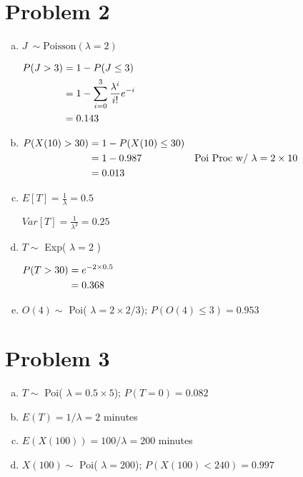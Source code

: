\documentclass[11pt]{article}
\newenvironment{equ}{$\hfill\begin{aligned}[t]}{\end{aligned}\hfill \null$}
\begin{document}
\section*{Problem 2}
\begin{enumerate}[(a)]
	\item $J\ \sim \text{Poisson} ( \lambda = 2 )$

		\begin{equ}
			P( J > 3 ) &= 1 -P( J \leq 3 ) \\
			&= 1-\sum \limits _{i=0} ^{3} \dfrac{\lambda^i}{i!}e^{-i} \\
			&= 0.143
		\end{equ}

	\item
		\begin{equ}
			P( X(10) > 30 ) &= 1 - P( X(10) \leq 30 ) \\
			&= 1 - 0.987 & \text{Poi Proc w/ } \lambda=2 \times 10 \\
			&= 0.013
		\end{equ}

	\item $E[T] = \frac{1}{\lambda} = 0.5$

		$Var[T] = \frac{1}{\lambda ^2} = 0.25$

	\item $T \sim$ Exp( $\lambda = 2$ )

		\begin{equ} 
			P(T > 30) &= e^{-2 \times 0.5} \\
			&= 0.368
		\end{equ}

	\item $O(4) \sim$ Poi( $\lambda = 2 \times 2/3$); $P(O(4) \leq 3) = 0.953$
\end{enumerate}	

\section*{Problem 3}
\begin{enumerate}[(a)]
	\item $T \sim $ Poi( $\lambda = 0.5 \times 5$); $P( T = 0) = 0.082$
	\item $E(T) = 1/\lambda = 2$ minutes
	\item $E(X(100)) = 100 / \lambda = 200$ minutes
	\item $X(100) \sim $ Poi( $\lambda = 200$); $P( X(100) < 240 ) = 0.997$
\end{enumerate}




		
\end{document}
